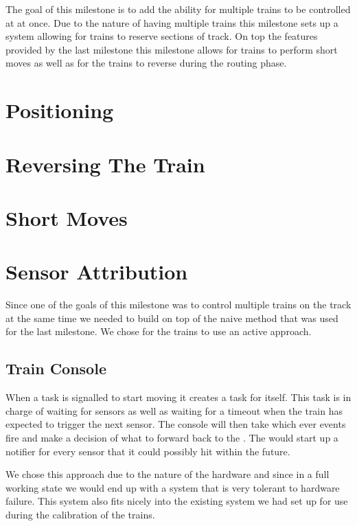 \documentclass[pdftex,10pt,a4paper]{article}
\begin{document}
The goal of this milestone is to add the ability for multiple trains to be
controlled at at once. Due to the nature of having multiple trains this
milestone sets up a system allowing for trains to reserve sections of track. On
top the features provided by the last milestone this milestone allows for trains
to perform short moves as well as for the trains to reverse during the routing
phase.

\section*{Positioning}

\section*{Reversing The Train}

\section*{Short Moves}

\section*{Sensor Attribution}

Since one of the goals of this milestone was to control multiple trains on the
track at the same time we needed to build on top of the naive method that was
used for the last milestone. We chose for the trains to use an active approach.

\subsection*{Train Console}

When a  task is signalled to start moving it creates a
 task for itself. This task is in charge of waiting for
sensors as well as waiting for a timeout when the train has expected to trigger
the next sensor. The console will then take which ever events fire and make a
decision of what to forward back to the . The 
 would start up a notifier for every sensor that it could
possibly hit within the future.

We chose this approach due to the nature of the hardware and since in a full
working state we would end up with a system that is very tolerant to hardware
failure. This system also fits nicely into the existing system we had set up
for use during the calibration of the trains.
\end{document}
